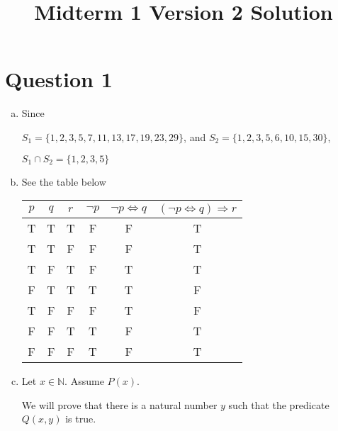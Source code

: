 \documentclass[12pt]{article}
\begin{document}
\title{Midterm 1 Version 2 Solution}
\maketitle

\section*{Question 1}
\begin{enumerate}[a.]
    \item

    Since

    $S_1 = \{1,2,3,5,7,11,13,17,19,23,29\}$, and $S_2 = \{1,2,3,5,6,10,15,30\}$,

    $S_1 \cap S_2 = \{1,2,3,5\}$

    \item

    See the table below

    \begin{tabular}{c|c|c|c|c|c}
        $p$ & $q$ & $r$ & $\neg p$ & $\neg p \Leftrightarrow q$ & $(\neg p \Leftrightarrow q) \Rightarrow r$\\
        \hline
        T & T & T & F & F & T\\
        \hline
        T & T & F & F & F & T\\
        \hline
        T & F & T & F & T & T\\
        \hline
        F & T & T & T & T & F\\
        \hline
        T & F & F & F & T & F\\
        \hline
        F & F & T & T & F & T\\
        \hline
        F & F & F & T & F & T
    \end{tabular}

    \item

    Let $x \in \mathbb{N}$. Assume $P(x)$.

    \bigskip

    We will prove that there is a natural number $y$ such that the predicate
    $Q(x,y)$ is true.

\end{enumerate}
\end{document}
